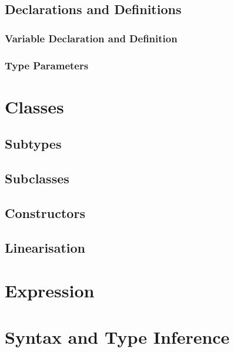 \section{Declarations and Definitions}
\subsection{Variable Declaration and Definition}
\subsection{Type Parameters}

\chapter{Classes}
\section{Subtypes}
\section{Subclasses}

\section{Constructors}
\section{Linearisation}

\chapter{Expression}

\chapter{Syntax and Type Inference}
